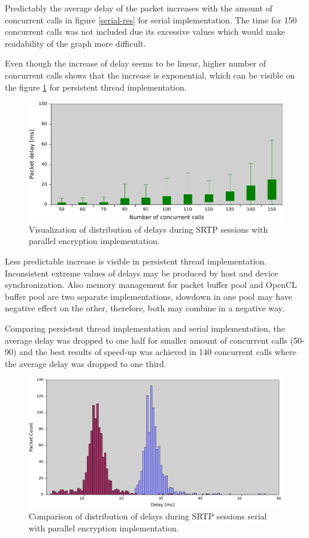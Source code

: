 Predictably the average delay of the packet increases with the amount of 
concurrent calls in figure \ref{serial-res} for serial implementation. The time
for 150 concurrent calls was not included due its excessive values which would
make readability of the graph more difficult. 

Even though the increase of delay seems to be linear, higher number of 
concurrent calls shows that the increase is exponential, which can be visible
on the figure \ref{pt-res} for persistent thread implementation.

\begin{figure}[H]
\centering
\includegraphics[width=15cm]{fig/persistent-thread-res.pdf}
\caption[Packet delay using parallel implementation]{Visualization of 
distribution of delays during SRTP sessions with parallel encryption 
implementation.}
\label{pt-res}
\end{figure}

Less predictable increase is visible in persistent thread implementation.
Inconsistent extreme values of delays may be produced by host and device
synchronization. Also memory management for packet buffer pool and OpenCL
buffer pool are two separate implementations, slowdown in one pool may have
negative effect on the other, therefore, both may combine in a negative way.

Comparing persistent thread implementation and serial implementation, the 
average delay was dropped to one half for smaller amount of concurrent calls
(50-90) and the best results of speed-up was achieved in 140 concurrent calls
where the average delay was dropped to one third.

\begin{figure}[H]
\centering
\includegraphics[width=15cm]{fig/delay_comparison.pdf}
\caption[Comparison of packet delays]{Comparison of distribution of delays 
during SRTP sessions serial with 
parallel encryption implementation.}
\label{dist-comp}
\end{figure}  


